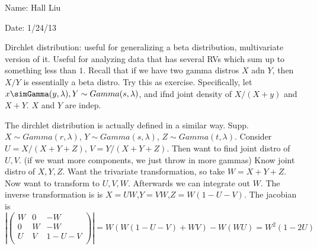 \documentclass{article}
\begin{document}
Name: Hall Liu

Date: 1/24/13
\vspace{1.5cm}

Dirchlet distribution: useful for generalizing a beta distribution, multivariate version of it. Useful for analyzing data that has several RVs which sum up to something less than $1$. Recall that if we have two gamma distros $X$ adn $Y$, then $X/Y$ is essentially a beta distro. Try this as exercise. Specifically, let $x\simGamma(y,\lambda), Y\sim Gamma(s,\lambda)$, and ifnd joint density of $X/(X+y)$ and $X+Y$. $X$ and $Y$ are indep.

The dirchlet distribution is actually defined in a similar way. Supp. $X\sim Gamma(r,\lambda)$, $Y\sim Gamma(s,\lambda)$, $Z\sim Gamma(t,\lambda)$. Consider $U=X/(X+Y+Z)$, $V=Y/(X+Y+Z)$. Then want to find joint distro of $U,V$. (if we want more components, we just throw in more gammas) Know joint distro of $X,Y,Z$. Want the trivariate transformation, so take $W=X+Y+Z$. Now want to transform to $U,V,W$. Afterwards we can integrate out $W$. The inverse transformation is is $X=UW$,$Y=VW$,$Z=W(1-U-V)$. The jacobian is 
$$\left|\begin{pmatrix}
W&0&-W\\
0&W&-W\\
U&V&1-U-V\\
\end{pmatrix}\right|=W(W(1-U-V)+WV)-W(WU)=W^2(1-2U)$$
\end{document}
